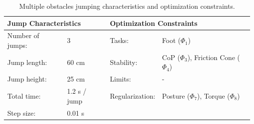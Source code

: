 \begin{table}[t]
\centering
\caption[Multiple obstacles jumping characteristics and optimization constraints]{Multiple obstacles jumping characteristics and optimization constraints.}
\begin{tabular}{|ll|ll|}
\hline
\multicolumn{2}{|l|}{\textbf{Jump Characteristics}} & \multicolumn{2}{l|}{\textbf{Optimization Constraints}} \\ \hline
Number of jumps: & 3 	& Tasks: 			& Foot ($\Phi_1$) \\ \hline
Jump length:& 60 cm 	& Stability: 		& \gls{CoP} ($\Phi_3$), Friction Cone ($\Phi_4$)\\ \hline
Jump height:& 25 cm  	& Limits:   & - \\ \hline
Total time:& 1.2 s / jump  & Regularization: 	& Posture ($\Phi_7$), Torque ($\Phi_8$)\\ \hline
Step size:& 0.01 s & & \\ \hline
\end{tabular}
\label{tab:jumpObstacles}
\end{table}

